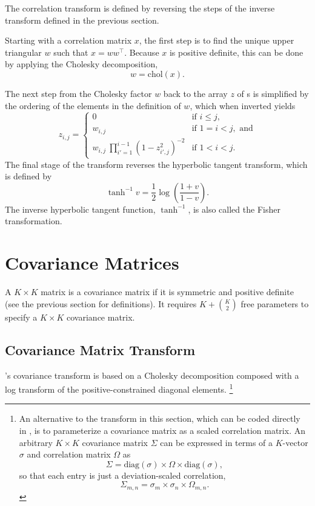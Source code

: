 The correlation transform is defined by reversing the steps of the
inverse transform defined in the previous section.

Starting with a correlation matrix $x$, the first step is to find the
unique upper triangular $w$ such that $x = w w^{\top}$.  Because $x$
is positive definite, this can be done by applying the Cholesky
decomposition,
\[
w = \mbox{chol}(x).
\]


The next step from the Cholesky factor $w$ back to the array $z$ of
{\CPC}s is simplified by the ordering of the elements in the
definition of $w$, which when inverted yields
%
\[
z_{i,j} =
\left\{
\begin{array}{cl}
0 & \mbox{if } i \leq j,
\\[8pt]
w_{i,j} & \mbox{if } 1 = i < j, \mbox{ and}
\\[8pt]
{w_{i,j}}
\
\prod_{i'=1}^{i-1} \left( 1 - z_{i'\!,j}^2 \right)^{-2}
& \mbox{if } 1 < i < j.
\end{array}
\right.
\]
The final stage of the transform reverses the hyperbolic tangent
transform, which is defined by
\[
\tanh^{-1} v = \frac{1}{2} \log \left( \frac{1 + v}{1 - v} \right).
\]
The inverse hyperbolic tangent function, $\tanh^{-1}$, is also called
the Fisher transformation.


\section{Covariance Matrices}

A $K \times K$ matrix is a covariance matrix if it is symmetric and
positive definite (see the previous section for definitions).  It
requires $K + \binom{K}{2}$ free parameters to specify a $K \times K$
covariance matrix.


\subsection{Covariance Matrix Transform}

\Stan's covariance transform is based on a Cholesky decomposition
composed with a log transform of the positive-constrained diagonal
elements.%
%
\footnote{An alternative to the transform in this section, which can
  be coded directly in \Stan, is to parameterize a covariance matrix
  as a scaled correlation matrix.  An arbitrary $K \times K$
  covariance matrix $\Sigma$ can be expressed in terms of a $K$-vector
  $\sigma$ and correlation matrix $\Omega$ as
  \[
  \Sigma = \mbox{diag}(\sigma) \times \Omega \times \mbox{diag}(\sigma),
  \]
  so that each entry is just a deviation-scaled correlation,
  \[
  \Sigma_{m,n} = \sigma_m \times \sigma_n \times \Omega_{m,n}.
  \]
}

